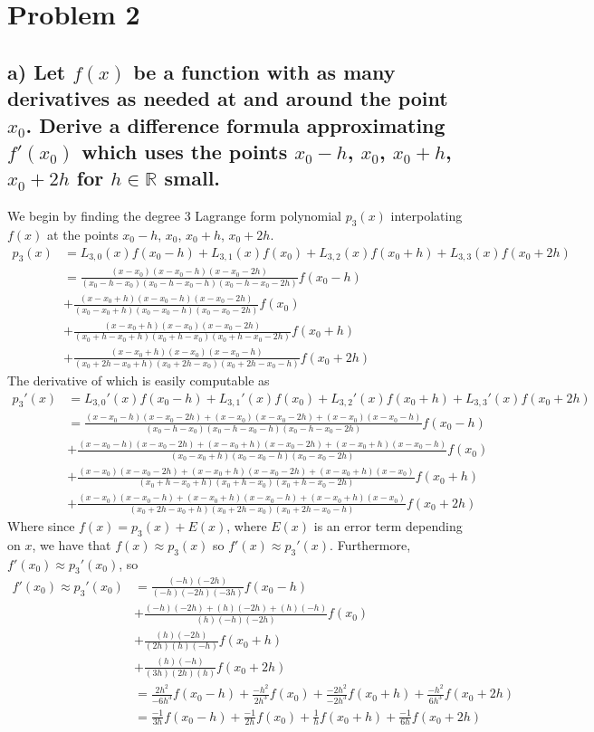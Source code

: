 \documentclass[11pt, letterpaper]{article}
\begin{document}
\section*{Problem 2}
\subsection*{a) \normalfont Let $f(x)$ be a function with as many derivatives as needed at and around the point $x_0$. 
Derive a difference formula approximating $f'(x_0)$ which uses the points $x_0-h$, $x_0$, $x_0+h$, $x_0+2h$ for $h\in\mathbb{R}$ small.}
We begin by finding the degree 3 Lagrange form polynomial $p_3(x)$ interpolating $f(x)$ at the points $x_0-h$, $x_0$, $x_0+h$, $x_0+2h$.
\begin{align*}
    p_3(x)&=L_{3,0}(x)f(x_0-h)+L_{3,1}(x)f(x_0)+L_{3,2}(x)f(x_0+h)+L_{3,3}(x)f(x_0+2h)\\
    &=\frac{(x-x_0)(x-x_0-h)(x-x_0-2h)}{(x_0-h-x_0)(x_0-h-x_0-h)(x_0-h-x_0-2h)}f(x_0-h)\\
    &+\frac{(x-x_0+h)(x-x_0-h)(x-x_0-2h)}{(x_0-x_0+h)(x_0-x_0-h)(x_0-x_0-2h)}f(x_0)\\
    &+\frac{(x-x_0+h)(x-x_0)(x-x_0-2h)}{(x_0+h-x_0+h)(x_0+h-x_0)(x_0+h-x_0-2h)}f(x_0+h)\\
    &+\frac{(x-x_0+h)(x-x_0)(x-x_0-h)}{(x_0+2h-x_0+h)(x_0+2h-x_0)(x_0+2h-x_0-h)}f(x_0+2h)
\end{align*}
The derivative of which is easily computable as 
\begin{align*}
    p_3'(x)&=L_{3,0}'(x)f(x_0-h)+L_{3,1}'(x)f(x_0)+L_{3,2}'(x)f(x_0+h)+L_{3,3}'(x)f(x_0+2h)\\
    &=\frac{(x-x_0-h)(x-x_0-2h)+(x-x_0)(x-x_0-2h)+(x-x_0)(x-x_0-h)}{(x_0-h-x_0)(x_0-h-x_0-h)(x_0-h-x_0-2h)}f(x_0-h)\\
    &+\frac{(x-x_0-h)(x-x_0-2h)+(x-x_0+h)(x-x_0-2h)+(x-x_0+h)(x-x_0-h)}{(x_0-x_0+h)(x_0-x_0-h)(x_0-x_0-2h)}f(x_0)\\
    &+\frac{(x-x_0)(x-x_0-2h)+(x-x_0+h)(x-x_0-2h)+(x-x_0+h)(x-x_0)}{(x_0+h-x_0+h)(x_0+h-x_0)(x_0+h-x_0-2h)}f(x_0+h)\\
    &+\frac{(x-x_0)(x-x_0-h)+(x-x_0+h)(x-x_0-h)+(x-x_0+h)(x-x_0)}{(x_0+2h-x_0+h)(x_0+2h-x_0)(x_0+2h-x_0-h)}f(x_0+2h)
\end{align*}
Where since $f(x)=p_3(x)+E(x)$, where $E(x)$ is an error term depending on $x$, we have that $f(x)\approx p_3(x)$ so
$f'(x)\approx p_3'(x)$. Furthermore, $f'(x_0)\approx p_3'(x_0)$, so
\begin{align*}
    f'(x_0)\approx p_3'(x_0)
    &=\frac{(-h)(-2h)}{(-h)(-2h)(-3h)}f(x_0-h)\\
    &+\frac{(-h)(-2h)+(h)(-2h)+(h)(-h)}{(h)(-h)(-2h)}f(x_0)\\
    &+\frac{(h)(-2h)}{(2h)(h)(-h)}f(x_0+h)\\
    &+\frac{(h)(-h)}{(3h)(2h)(h)}f(x_0+2h)\\
    &=\frac{2h^2}{-6h^3}f(x_0-h)+\frac{-h^2}{2h^3}f(x_0)+\frac{-2h^2}{-2h^3}f(x_0+h)+\frac{-h^2}{6h^3}f(x_0+2h)\\
    &=\frac{-1}{3h}f(x_0-h)+\frac{-1}{2h}f(x_0)+\frac{1}{h}f(x_0+h)+\frac{-1}{6h}f(x_0+2h)
\end{align*}
\end{document}
